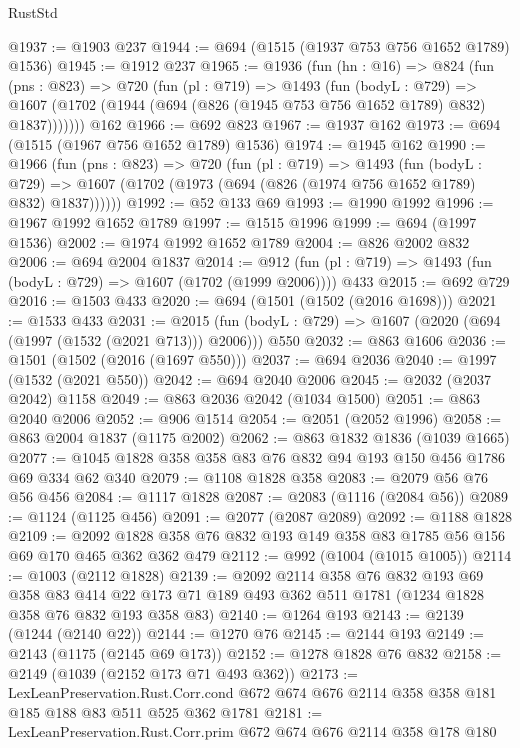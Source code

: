 \begin{lexlean}{RustStd}
\begin{coremodule}
@1937 := @1903 @237
@1944 := @694 (@1515 (@1937 @753 @756 @1652 @1789) @1536)
@1945 := @1912 @237
@1965 := @1936
    (fun (hn : @16) =>
    @824
      (fun (pns : @823) =>
      @720
        (fun (pl : @719) =>
        @1493
          (fun (bodyL : @729) =>
          @1607 (@1702 (@1944 (@694 (@826 (@1945 @753 @756 @1652 @1789) @832) @1837)))))))
    @162
@1966 := @692 @823
@1967 := @1937 @162
@1973 := @694 (@1515 (@1967 @756 @1652 @1789) @1536)
@1974 := @1945 @162
@1990 := @1966
    (fun (pns : @823) =>
    @720
      (fun (pl : @719) =>
      @1493
        (fun (bodyL : @729) =>
        @1607 (@1702 (@1973 (@694 (@826 (@1974 @756 @1652 @1789) @832) @1837))))))
@1992 := @52 @133 @69
@1993 := @1990 @1992
@1996 := @1967 @1992 @1652 @1789
@1997 := @1515 @1996
@1999 := @694 (@1997 @1536)
@2002 := @1974 @1992 @1652 @1789
@2004 := @826 @2002 @832
@2006 := @694 @2004 @1837
@2014 := @912 (fun (pl : @719) => @1493 (fun (bodyL : @729) => @1607 (@1702 (@1999 @2006)))) @433
@2015 := @692 @729
@2016 := @1503 @433
@2020 := @694 (@1501 (@1502 (@2016 @1698)))
@2021 := @1533 @433
@2031 := @2015 (fun (bodyL : @729) => @1607 (@2020 (@694 (@1997 (@1532 (@2021 @713))) @2006))) @550
@2032 := @863 @1606
@2036 := @1501 (@1502 (@2016 (@1697 @550)))
@2037 := @694 @2036
@2040 := @1997 (@1532 (@2021 @550))
@2042 := @694 @2040 @2006
@2045 := @2032 (@2037 @2042) @1158
@2049 := @863 @2036 @2042 (@1034 @1500)
@2051 := @863 @2040 @2006
@2052 := @906 @1514
@2054 := @2051 (@2052 @1996)
@2058 := @863 @2004 @1837 (@1175 @2002)
@2062 := @863 @1832 @1836 (@1039 @1665)
@2077 := @1045 @1828 @358 @358 @83 @76 @832 @94 @193 @150 @456 @1786 @69 @334 @62 @340
@2079 := @1108 @1828 @358
@2083 := @2079 @56 @76 @56 @456
@2084 := @1117 @1828
@2087 := @2083 (@1116 (@2084 @56))
@2089 := @1124 (@1125 @456)
@2091 := @2077 (@2087 @2089)
@2092 := @1188 @1828
@2109 := @2092 @1828 @358 @76 @832 @193 @149 @358 @83 @1785 @56 @156 @69 @170 @465 @362 @362 @479
@2112 := @992 (@1004 (@1015 @1005))
@2114 := @1003 (@2112 @1828)
@2139 := @2092
    @2114
    @358
    @76
    @832
    @193
    @69
    @358
    @83
    @414
    @22
    @173
    @71
    @189
    @493
    @362
    @511
    @1781
    (@1234 @1828 @358 @76 @832 @193 @358 @83)
@2140 := @1264 @193
@2143 := @2139 (@1244 (@2140 @22))
@2144 := @1270 @76
@2145 := @2144 @193
@2149 := @2143 (@1175 (@2145 @69 @173))
@2152 := @1278 @1828 @76 @832
@2158 := @2149 (@1039 (@2152 @173 @71 @493 @362))
@2173 := LexLeanPreservation.Rust.Corr.cond
    @672
    @674
    @676
    @2114
    @358
    @358
    @181
    @185
    @188
    @83
    @511
    @525
    @362
    @1781
@2181 := LexLeanPreservation.Rust.Corr.prim @672 @674 @676 @2114 @358 @178 @180

\end{coremodule}
\end{lexlean}
